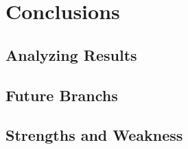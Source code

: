 \documentclass{book} %
\begin{document}
\chapter{Conclusions} \label{chap:c6_conclusions}
\section{Analyzing Results}
\section{Future Branchs}
\section{Strengths and Weakness}

\listoffigures{}
\end{document}
